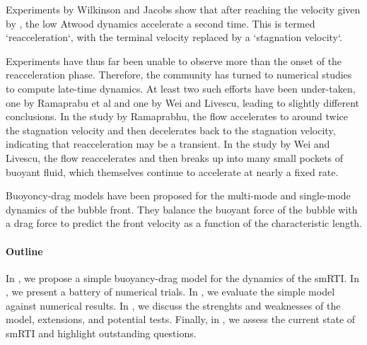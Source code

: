 Experiments by Wilkinson and Jacobs show that after reaching the velocity given by , the low Atwood dynamics accelerate a second time.
This is termed `reacceleration`, with the terminal velocity replaced by a `stagnation velocity`.

Experiments have thus far been unable to observe more than the onset of the reacceleration phase.
Therefore, the community has turned to numerical studies to compute late-time dynamics.
At least two such efforts have been under-taken, one by Ramaprabu et al and one by Wei and Livescu, leading to slightly different conclusions.
In the study by Ramaprabhu, the flow accelerates to around twice the stagnation velocity and then decelerates back to the stagnation velocity, indicating that reacceleration may be a transient.
In the study by Wei and Livescu, the flow reaccelerates and then breaks up into many small pockets of buoyant fluid, which themselves continue to accelerate at nearly a fixed rate.

Buoyoncy-drag models have been proposed for the multi-mode and single-mode dynamics of the bubble front.
They balance the buoyant force of the bubble with a drag force to predict the front velocity as a function of the characteristic length.


\paragraph{Outline}
In , we propose a simple buoyancy-drag model for the dynamics of the smRTI.
In , we present a battery of numerical trials.
In , we evaluate the simple model against numerical results.
In , we discuss the strenghts and weaknesses of the model, extensions, and potential tests.
Finally, in , we assess the current state of smRTI and highlight outstanding questions.

